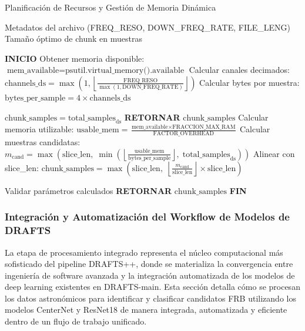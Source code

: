 \begin{algorithm}[H]
\caption{Planificación de Recursos y Gestión de Memoria Dinámica}
\label{alg:resource-planning}
\begin{algorithmic}[1]
\Require Metadatos del archivo (FREQ\_RESO, DOWN\_FREQ\_RATE, FILE\_LENG)
\Ensure Tamaño óptimo de chunk en muestras

\State \textbf{INICIO}
\State Obtener memoria disponible: $\text{mem\_available} = \text{psutil.virtual\_memory().available}$
\State Calcular canales decimados: $\text{channels\_ds} = \max\!\left(1, \left\lfloor \frac{\text{FREQ\_RESO}}{\max(1,\text{DOWN\_FREQ\_RATE})} \right\rfloor\right)$
\State Calcular bytes por muestra: $\text{bytes\_per\_sample} = 4 \times \text{channels\_ds}$

    \State $\text{chunk\_samples} = \text{total\_samples}_{\mathrm{ds}}$
    \State \textbf{RETORNAR} $\text{chunk\_samples}$
\Else
    \State Calcular memoria utilizable: $\text{usable\_mem} = \frac{\text{mem\_available} \times \text{FRACCION\_MAX\_RAM}}{\text{FACTOR\_OVERHEAD}}$
    \State Calcular muestras candidatas: $m_{\text{cand}} = \max\!\left(\text{slice\_len},\; \min\!\left(\left\lfloor \frac{\text{usable\_mem}}{\text{bytes\_per\_sample}} \right\rfloor,\; \text{total\_samples}_{\mathrm{ds}}\right)\right)$
    \State Alinear con slice\_len: $\text{chunk\_samples} = \max\!\left(\text{slice\_len},\; \left\lfloor \frac{m_{\text{cand}}}{\text{slice\_len}} \right\rfloor \times \text{slice\_len} \right)$
\EndIf

\State Validar parámetros calculados
\State \textbf{RETORNAR} $\text{chunk\_samples}$
\State \textbf{FIN}
\end{algorithmic}
\end{algorithm}

\subsubsection{Integración y Automatización del Workflow de Modelos de DRAFTS}

La etapa de procesamiento integrado representa el núcleo computacional más sofisticado del pipeline DRAFTS++, donde se materializa la convergencia entre ingeniería de software avanzada y la integración automatizada de los modelos de deep learning existentes en DRAFTS-main. Esta sección detalla cómo se procesan los datos astronómicos para identificar y clasificar candidatos FRB utilizando los modelos CenterNet y ResNet18 de manera integrada, automatizada y eficiente dentro de un flujo de trabajo unificado.

